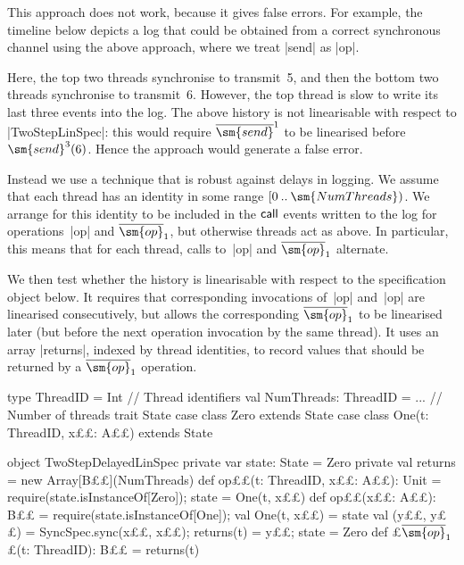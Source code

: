 This approach does not work, because it gives false errors.  For example, the
timeline below depicts a log that could be obtained from a correct synchronous
channel using the above approach, where we treat |send| as |op|.
%
\begin{center}
\unScalaMid
{}
\scalaMid
\end{center}
%
Here, the top two threads synchronise to transmit~5, and then the bottom two
threads synchronise to transmit~6.  However, the top thread is slow to write
its last three events into the log.  The above history is not linearisable
with respect to |TwoStepLinSpec|: this would require $\overline{\sm{send}}^1$
to be linearised before $\sm{send}^3(6)$.  Hence the approach would generate a
false error.

Instead we use a technique that is robust against delays in logging.  We
assume that each thread has an identity in some range $\range 0
{\sm{NumThreads}}$.  We arrange for this identity to be included in the
$\mathsf{call}$ events written to the log for operations~|op| and
$\overline{\sm{op}}_1$, but otherwise threads act as above.  In particular,
this means that for each thread, calls to~|op| and $\overline{\sm{op}}_1$
alternate.

We then test whether the history is linearisable with respect to the
specification object below.  It requires that corresponding invocations
of~|op| and~|op| are linearised consecutively, but allows the
corresponding $\overline{\sm{op}}_1$ to be linearised later (but before the
next operation invocation by the same thread).  It uses an array |returns|,
indexed by thread identities, to record values that should be returned by a
$\overline{\sm{op}}_1$ operation.
%
\begin{scala}
type ThreadID = Int               // Thread identifiers
val NumThreads: ThreadID = ... // Number of threads
trait State
case class Zero extends State
case class One(t: ThreadID, x££: A££) extends State

object TwoStepDelayedLinSpec{
  private var state: State = Zero
  private val returns = new Array[B££](NumThreads)
  def op££(t: ThreadID, x££: A££): Unit = {
    require(state.isInstanceOf[Zero]); state = One(t, x££)
  }
  def op££(x££: A££): B££ = {
    require(state.isInstanceOf[One]); val One(t, x££) = state
    val (y££, y££) = SyncSpec.sync(x££, x££); returns(t) = y££; state = Zero
  }
  def £$\overline{\sm{op}}_1$£(t: ThreadID): B££ = returns(t) 
}
\end{scala}

